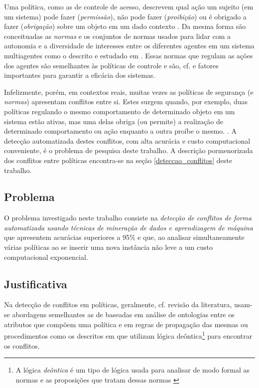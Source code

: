 Uma política, como as de controle de acesso, descrevem qual ação um sujeito (em um sistema) pode fazer (\textit{permissão}), não pode fazer (\textit{proibição}) ou é obrigado a fazer (\textit{obrigação}) sobre um objeto em um dado contexto \cite{sarkis2017}. Da mesma forma são conceituadas as \textit{normas} e os conjuntos de normas usados para lidar com a autonomia e a diversidade de interesses entre os diferentes agentes em um sistema multiagentes como o descrito e estudado em \cite{eduardo2017}. Essas normas que regulam as ações dos agentes são semelhantes às políticas de controle e são, cf. \cite{eduardo2017} e \cite{sarkis:artigo:2016} fatores importantes para garantir a eficácia dos sistemas.

Infelizmente, porém, em contextos reais, muitas vezes as políticas de segurança (e \textit{normas}) apresentam conflitos entre si. Estes surgem quando, por exemplo, duas políticas regulando o mesmo comportamento de determinado objeto em um sistema estão ativas, mas uma delas obriga (ou permite) a realização de determinado comportamento ou ação enquanto a outra proíbe o mesmo. \cite{sarkis2017}\cite{eduardo2017}. A detecção automatizada destes conflitos, com alta acurácia e custo computacional conveniente, é o problema de pesquisa deste trabalho. A descrição pormenorizada dos conflitos entre políticas encontra-se na seção \ref{deteccao_conflitos} deste trabalho.
\subsection{Problema}\label{problema}
O problema investigado neste trabalho consiste na \textit{detecção de conflitos de forma automatizada usando técnicas de mineração de dados e aprendizagem de máquina} que apresentem acurácias superiores a 95\% e que, ao analisar simultaneamente várias políticas ao se inserir uma nova instância não leve a um custo computacional exponencial.
\subsection{Justificativa}\label{justificativa}
Na detecção de conflitos em políticas, geralmente, cf. revisão da literatura,  usam-se abordagens semelhantes as de \cite{sarkis2017} baseadas em análise de ontologias entre os atributos que compõem uma política e em regras de propagação das mesmas ou procedimentos como os descritos em \cite{eduardo2017} que utilizam lógica deôntica\footnote{A lógica \textit{deôntica} é um tipo de lógica usada para analisar de modo formal as normas e as proposições que tratam dessas normas \cite{eduardo2017} } para encontrar os conflitos. 

